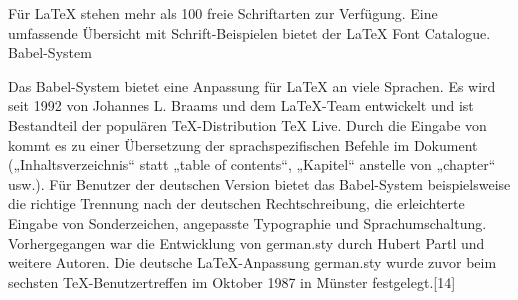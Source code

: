 Für LaTeX stehen mehr als 100 freie Schriftarten zur Verfügung. Eine umfassende Übersicht mit Schrift-Beispielen bietet der LaTeX Font Catalogue.
Babel-System

Das Babel-System bietet eine Anpassung für LaTeX an viele Sprachen. Es wird seit 1992 von Johannes L. Braams und dem LaTeX-Team entwickelt und ist Bestandteil der populären TeX-Distribution TeX Live. Durch die Eingabe von kommt es zu einer Übersetzung der sprachspezifischen Befehle im Dokument („Inhaltsverzeichnis“ statt „table of contents“, „Kapitel“ anstelle von „chapter“ usw.). Für Benutzer der deutschen Version bietet das Babel-System beispielsweise die richtige Trennung nach der deutschen Rechtschreibung, die erleichterte Eingabe von Sonderzeichen, angepasste Typographie und Sprachumschaltung. Vorhergegangen war die Entwicklung von german.sty durch Hubert Partl und weitere Autoren.\cite{Babel}\cite{Kopka} Die deutsche LaTeX-Anpassung german.sty wurde zuvor beim sechsten TeX-Benutzertreffen im Oktober 1987 in Münster festgelegt.[14]